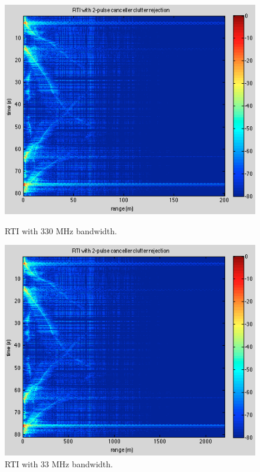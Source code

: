 \documentclass{article}
\begin{document}
\begin{figure}[ht]
\begin{minipage}[b]{0.33\linewidth}
\centering
\includegraphics[width=\textwidth]{Figures/bw_normal.png}
\caption{RTI with 330 MHz bandwidth.}
\label{fig:bw_normal}
\end{minipage}
\begin{minipage}[b]{0.33\linewidth}
\centering
\includegraphics[width=\textwidth]{Figures/bw_reduced.png}
\caption{RTI with 33 MHz bandwidth.}
\label{fig:bw_reduced}
\end{minipage}

\end{figure}
\end{document}
